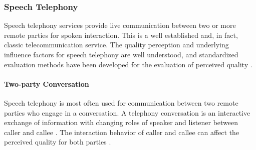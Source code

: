 \subsubsection*{Speech Telephony}\label{method:sct}
Speech telephony services provide live communication between two or more remote parties for spoken interaction.
This is a well established and, in fact, classic telecommunication service.
The quality perception and underlying influence factors for speech telephony are well understood, and standardized evaluation methods have been developed for the evaluation of perceived quality \citep[\eg,][]{itu_handbook_1992}.

\paragraph*{Two-party Conversation}
Speech telephony is most often used for communication between two remote parties who engage in a conversation.
A telephony conversation is an interactive exchange of information with changing roles of speaker and listener between caller and callee \citep[][]{hopper_telephone_1992}.
The interaction behavior of caller and callee can affect the perceived quality for both parties \citep[\eg,][]{schoenenberg_why_2014, egger_it_2010}.

